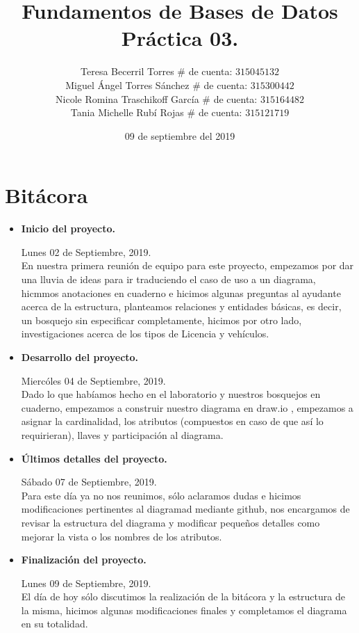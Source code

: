 \documentclass[letterpaper,11pt]{article}
\title{Fundamentos de Bases de Datos \\
       Práctica 03. }
\author{Teresa Becerril Torres
        $\#$ de cuenta: $315045132$ \\
        Miguel Ángel Torres Sánchez
        $\#$ de cuenta: $315300442$ \\
        Nicole Romina Traschikoff García
        $\#$ de cuenta: $315164482$ \\
        Tania Michelle Rubí Rojas
        $\#$ de cuenta: $315121719$}
\date{09 de septiembre del 2019}
\begin{document}
\maketitle

\section{Bitácora}
\begin{itemize}
    \item \textbf{Inicio del proyecto.}

    Lunes 02 de Septiembre, 2019.\\
    En nuestra primera reunión de equipo para este proyecto, empezamos por dar una lluvia de ideas para ir traduciendo el caso de uso a un diagrama, hicmmos anotaciones en cuaderno e hicimos algunas preguntas al ayudante acerca de la estructura, planteamos relaciones y entidades básicas, es decir, un bosquejo sin especificar completamente, hicimos por otro lado, investigaciones acerca de los tipos de Licencia y vehículos.

    \item \textbf{Desarrollo del proyecto.}

    Miercóles 04 de Septiembre, 2019.\\
    Dado lo que habíamos hecho en el laboratorio y nuestros bosquejos en cuaderno, empezamos a construir nuestro diagrama en draw.io , empezamos a asignar la cardinalidad, los atributos (compuestos en caso de que así lo requirieran), llaves y participación al diagrama.


    \item \textbf{Últimos detalles del proyecto.}

    Sábado 07 de Septiembre, 2019.\\
    Para este día ya no nos reunimos, sólo aclaramos dudas e hicimos modificaciones pertinentes al diagramad mediante github, nos encargamos de revisar la estructura del diagrama y modificar pequeños detalles como mejorar la vista o los nombres de los atributos.

    \item \textbf{Finalización del proyecto.}
    
    Lunes 09 de Septiembre, 2019.\\
    El día de hoy sólo discutimos la realización de la bitácora y la estructura de la misma, hicimos algunas modificaciones finales y completamos el diagrama en su totalidad.

\end{itemize}
\end{document}

